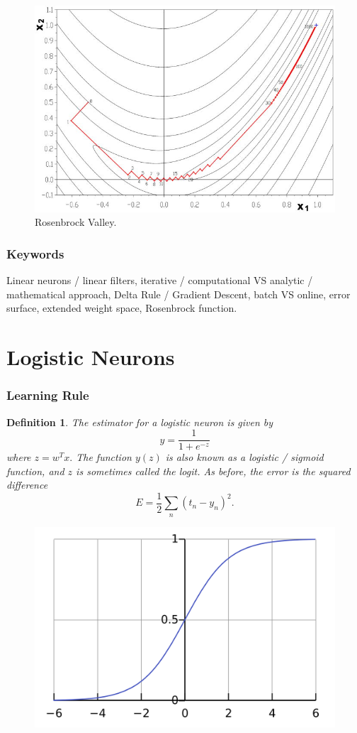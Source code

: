 \documentclass[12pt]{article}
\theoremstyle{plain}
\newtheorem{definition}[theorem]{Definition}
\theoremstyle{definition}
\theoremstyle{remark}
\begin{document}
\begin{figure}[H]
\centering
\includegraphics[width=1.0\textwidth]{slowlearrning}
\caption{Rosenbrock Valley.}
\end{figure}

\section*{Keywords}

Linear neurons / linear filters, iterative / computational VS analytic / mathematical approach, Delta Rule / Gradient Descent, batch VS online, error surface, extended weight space, Rosenbrock function.

\part{Logistic Neurons}

\section{Learning Rule}

\begin{definition}
The estimator for a logistic neuron is given by
$$y = \frac{1}{1 + e^{-z}}$$ where $z = w^T x.$ The function $y(z)$ is also known as a logistic / sigmoid function, and $z$ is sometimes called the logit. As before, the error is the squared difference
$$E = \frac{1}{2} \sum_n (t_n - y_n)^2.$$
\end{definition}

\begin{figure}[H]
\centering
\includegraphics[width=.7\textwidth]{Logistic-curve}
\end{figure}
\end{document}
